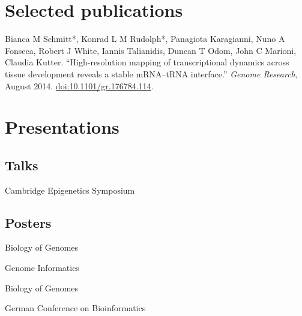 \documentclass{klmr-cv}
\begin{document}
\section{Selected publications}


\begin{enumerate}
    \listitem Bianca M Schmitt*, Konrad L M Rudolph*, Panagiota Karagianni,
        Nuno A Fonseca, Robert J White, Iannis Talianidis, Duncan T Odom,
        John C Marioni, Claudia Kutter. “High-resolution mapping of
        transcriptional dynamics across tissue development reveals a stable
        mRNA--tRNA interface.” \textit{Genome Research}, August 2014.
        \href{http://dx.doi.org/10.1101/gr.176784.114}{doi:10.1101/gr.176784.114}.
\end{enumerate}

\section{Presentations}

\subsection{Talks}

\date{2014}
\item{Cambridge Epigenetics Symposium}

\subsection{Posters}

\date{2015}
\item{Biology of Genomes}
\date{2014}
\item{Genome Informatics}
\date{2013}
\item{Biology of Genomes}
\date{2009}
\item{German Conference on Bioinformatics}
\end{document}
